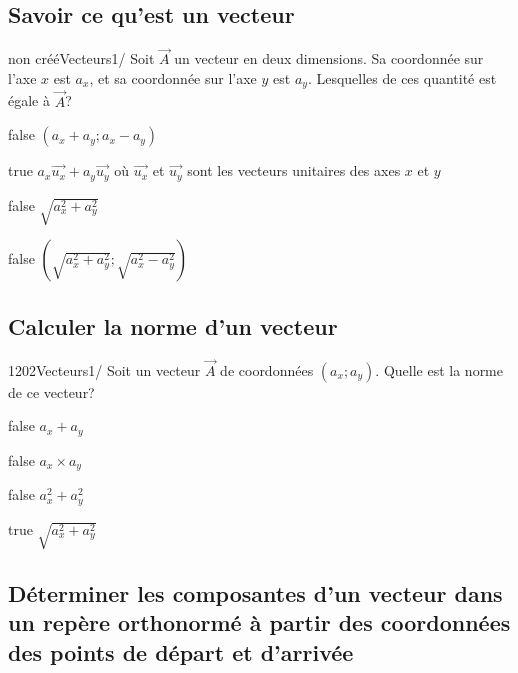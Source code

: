 \documentclass[11pt]{article}
\begin{document}
        \subsection{Savoir ce qu'est un vecteur}
        
        	\begin{question}{non créé}{Vecteurs}{1}{/}
				Soit $\vec{A}$ un vecteur en deux dimensions. Sa coordonnée sur l'axe $x$ est $a_x$, et sa coordonnée sur l'axe $y$ est $a_y$. Lesquelles de ces quantité est égale à $\vec{A}$?
            \end{question}

            \begin{reponses}
            	\item[false] $(a_x+a_y;a_x-a_y)$
            	\item[true] $a_x\vec{u_x}+a_y\vec{u_y}$ où $\vec{u_x}$ et $\vec{u_y}$ sont les vecteurs unitaires des axes $x$ et $y$
                \item[false] $\sqrt{a_{x}^2+a_{y}^2}$
                \item[false] $(\sqrt{a_{x}^2+a_{y}^2};\sqrt{a_{x}^2-a_{y}^2})$
            \end{reponses}

        \subsection{Calculer la norme d'un vecteur}
        
        	\begin{question}{1202}{Vecteurs}{1}{/}
				Soit un vecteur $\vec{A}$ de coordonnées $(a_x;a_y)$. Quelle est la norme de ce vecteur?
            \end{question}

            \begin{reponses}
            	\item[false] $a_x+a_y$
            	\item[false] $a_x\times a_y$
                \item[false] $a_{x}^2+a_{y}^2$
                \item[true] $\sqrt{a_{x}^2+a_{y}^2}$
            \end{reponses}
			
			 \subsection{Déterminer les composantes d'un vecteur dans un repère orthonormé à partir des coordonnées des points de départ et d'arrivée}
        
\end{document}
